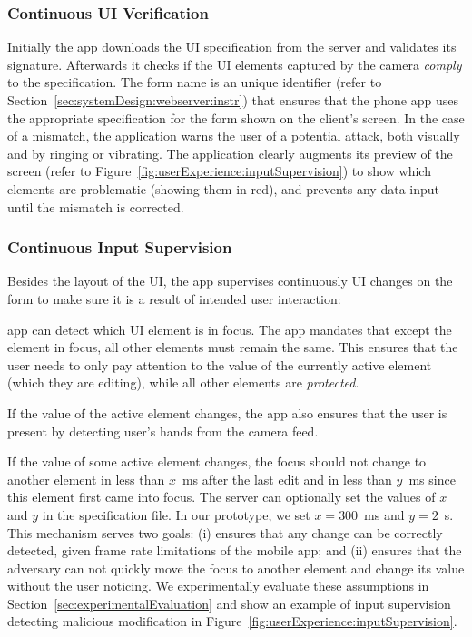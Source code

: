 \subsubsection{Continuous UI Verification}
\label{sec:systemDesign:phone:uiVerification}
Initially the app downloads the UI specification from the server and validates its signature. Afterwards it checks if the UI elements captured by the camera \textit{comply} to the specification. The form name is an unique identifier (refer to Section~\ref{sec:systemDesign:webserver:instr}) that ensures that the phone app uses the appropriate specification for the form shown on the client's screen. In the case of a mismatch, the application warns the user of a potential attack, both visually and by ringing or vibrating. The application clearly augments its preview of the screen (refer to Figure~\ref{fig:userExperience:inputSupervision}) to show which elements are problematic (showing them in red), and prevents any data input until the mismatch is corrected.

\subsubsection{Continuous Input Supervision}
\label{sec:systemDesign:phone:inputerSupervision}

Besides the layout of the UI, the app supervises continuously UI changes on the form to make sure it is a result of intended user interaction:

 \name app can detect which UI element is in focus. The app mandates that except the element in focus, all other elements must remain the same. This ensures that the user needs to only pay attention to the value of the currently active element (which they are editing), while all other elements are \emph{protected}.

 If the value of the active element changes, the app also ensures that the user is present by detecting user's hands from the camera feed.

 If the value of some active element changes, the focus should not change to another element in less than $x$~ms after the last edit and in less than $y$~ms since this element first came into focus. The server can optionally set the values of $x$ and $y$ in the specification file. In our prototype, we set $x=300$~ms and $y=2$~s. This mechanism serves two goals: (i) ensures that any change can be correctly detected, given frame rate limitations of the mobile app; and (ii) ensures that the adversary can not quickly move the focus to another element and change its value without the user noticing. We experimentally evaluate these assumptions in Section~\ref{sec:experimentalEvaluation} and show an example of input supervision detecting malicious modification in Figure~\ref{fig:userExperience:inputSupervision}.

